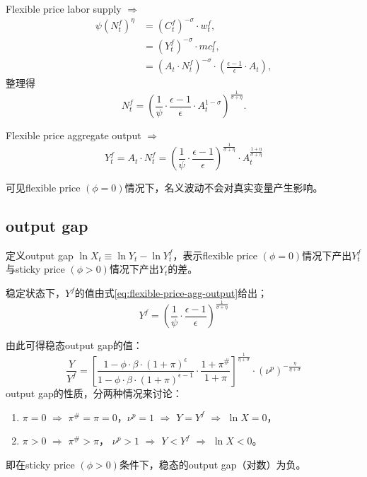Flexible price labor supply $\Rightarrow$
\begin{align*}
  \psi (N_t^f)^{\eta} &= (C_t^f)^{-\sigma} \cdot w_t^f,\\
                      &=(Y_t^f)^{-\sigma} \cdot mc_t^f,\\
                      &=\left( A_t \cdot N_t^f \right)^{-\sigma} \cdot \left( \frac{\epsilon -1}{\epsilon} \cdot A_t\right),
\end{align*}
整理得
\begin{equation}
  \label{eq:flexible-price-labor-supply}
  N_t^f = \left(\frac{1}{\psi} \cdot \frac{\epsilon -1}{\epsilon} \cdot A_t^{1-\sigma}\right)^{\frac{1}{\sigma + \eta}}.
\end{equation}

Flexible price aggregate output $\Rightarrow $
\begin{equation}
  \label{eq:flexible-price-agg-output}
  Y_t^f = A_t \cdot N_t^f = \left(\frac{1}{\psi} \cdot \frac{\epsilon -1}{\epsilon}\right)^{\frac{1}{\sigma + \eta}} \cdot  A_t^{\frac{1+\eta}{\sigma + \eta}}
\end{equation}

可见flexible price $(\phi =0)$情况下，名义波动不会对真实变量产生影响。

\subsection{output gap}
\label{output-gap}
定义output gap $\ln X_t \equiv \ln Y_t - \ln Y_t^f$，表示flexible price $(\phi = 0)$情况下产出$Y_t^f$与sticky price $(\phi >0)$情况下产出$Y_t$的差。

稳定状态下，$Y^f$的值由式\eqref{eq:flexible-price-agg-output}给出；
\begin{equation*}
    Y^f = \left(\frac{1}{\psi} \cdot \frac{\epsilon -1}{\epsilon}\right)^{\frac{1}{\sigma + \eta}}
\end{equation*}

由此可得稳态output gap的值：
\begin{equation}
  \label{eq:ss-output-gap}
  \frac{Y}{Y^f} =
  \left[
    \frac{1-\phi \cdot \beta \cdot (1+\pi)^{\epsilon}}{1-\phi \cdot \beta \cdot (1+\pi)^{\epsilon -1}} \cdot \frac{1+\pi^{\#}}{1+\pi}
  \right]^{\frac{1}{\eta + \sigma}} \cdot
  \left(
    \nu^p
  \right)^{- \frac{\eta}{\eta + \sigma}}
\end{equation}
output gap的性质，分两种情况来讨论：

\begin{enumerate}
\item $\pi = 0$ $\Rightarrow$ $\pi^{\#} = \pi = 0$，$\nu^p = 1$ $\Rightarrow$ $Y=Y^f$ $\Rightarrow$ $\ln X = 0$，
\item $\pi >0$ $\Rightarrow$ $\pi^{\#} > \pi$， $\nu^p >1$ $\Rightarrow$ $Y<Y^f$ $\Rightarrow$ $\ln X < 0$。
\end{enumerate}
即在sticky price $(\phi >0)$条件下，稳态的output gap（对数）为负。


